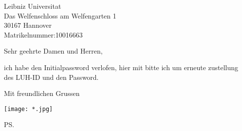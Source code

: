 \documentclass{letter}
\begin{document}
\begin{letter}{Leibniz Universitat \\Das Welfenschloss am Welfengarten 1\\30167 Hannover\\Matrikelnummer:10016663\\}
\opening{Sehr geehrte Damen und Herren, }
ich habe den Initialpassword verlofen, 
hier mit bitte ich um erneute zustellung des LUH-ID und den Password.

\closing{Mit freundlichen Grussen}
\texttt{[image: *.jpg]}

\ps


\end{letter}
\end{document}
